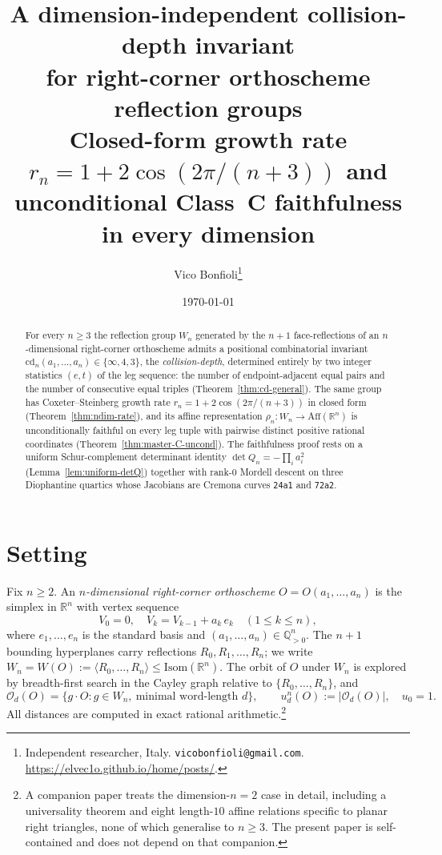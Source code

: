 \documentclass[11pt,a4paper]{article}
\title{\textbf{A dimension-independent collision-depth invariant\\
for right-corner orthoscheme reflection groups}\\[0.3em]
\large Closed-form growth rate $r_n = 1 + 2\cos(2\pi/(n+3))$ and unconditional Class~C faithfulness in every dimension}
\author{Vico Bonfioli\thanks{Independent researcher, Italy.
\texttt{vicobonfioli@gmail.com}.\,
\url{https://elvec1o.github.io/home/posts/}.}}
\date{\today}
\theoremstyle{remark}
\theoremstyle{plain}
\begin{document}
\sloppy
\maketitle

\begin{abstract}
For every $n \ge 3$ the reflection group $W_n$ generated by the
$n+1$ face-reflections of an $n$-dimensional right-corner orthoscheme
admits a positional combinatorial invariant
$\mathrm{cd}_n(a_1, \ldots, a_n) \in \{\infty, 4, 3\}$, the
\emph{collision-depth}, determined entirely by two integer statistics
$(e, t)$ of the leg sequence: the number of endpoint-adjacent equal
pairs and the number of consecutive equal triples (Theorem~\ref{thm:cd-general}).
The same group has Coxeter--Steinberg growth rate
$r_n = 1 + 2\cos(2\pi/(n+3))$ in closed form (Theorem~\ref{thm:ndim-rate}),
and its affine representation $\rho_n : W_n \to \mathrm{Aff}(\mathbb{R}^n)$
is unconditionally faithful on every leg tuple with pairwise distinct
positive rational coordinates (Theorem~\ref{thm:master-C-uncond}).
The faithfulness proof rests on a uniform Schur-complement determinant
identity $\det Q_n = -\prod_i a_i^2$ (Lemma~\ref{lem:uniform-detQ})
together with rank-$0$ Mordell descent on three Diophantine quartics
whose Jacobians are Cremona curves \texttt{24a1} and \texttt{72a2}.
\end{abstract}

\section{Setting}\label{sec:setting}

Fix $n \ge 2$.  An \emph{$n$-dimensional right-corner orthoscheme}
$O = O(a_1, \ldots, a_n)$ is the simplex in $\mathbb{R}^n$ with
vertex sequence
\[
V_0 = 0, \quad V_k = V_{k-1} + a_k\, e_k \quad (1 \le k \le n),
\]
where $e_1, \ldots, e_n$ is the standard basis and
$(a_1, \ldots, a_n) \in \mathbb{Q}_{>0}^n$.  The $n+1$ bounding
hyperplanes carry reflections $R_0, R_1, \ldots, R_n$; we write
$W_n = W(O) := \langle R_0, \ldots, R_n \rangle \le \mathrm{Isom}(\mathbb{R}^n)$.
The orbit of $O$ under $W_n$ is explored by breadth-first search in
the Cayley graph relative to $\{R_0, \ldots, R_n\}$, and
\[
\mathcal{O}_d(O) = \{ g \cdot O : g \in W_n,\ \text{minimal word-length } d\},
\qquad u_d^n(O) := |\mathcal{O}_d(O)|, \quad u_0 = 1.
\]
All distances are computed in exact rational arithmetic.\footnote{%
A companion paper treats the dimension-$n=2$ case in detail,
including a universality theorem and eight length-$10$ affine
relations specific to planar right triangles, none of which
generalise to $n \ge 3$.  The present paper is self-contained and
does not depend on that companion.}
\end{document}

